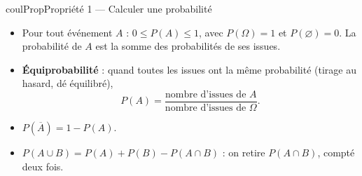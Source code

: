 \documentclass[11pt,a4paper]{article}
\makeatletter
\renewcommand{\le}{\leqslant}
\newcounter{lycee@signet}
\newcommand{\signet}[3][]{\stepcounter{lycee@signet}%
  \edef\lycee@dest{\if\relax\detokenize{#1}\relax
    signet.\arabic{lycee@signet}\else#1\fi}%
  \hypertarget{\lycee@dest}{}\bookmark[level=#2,dest=\lycee@dest]{#3}}
\newenvironment{proprietebox}[1][Propriété]%
  {\begin{boitecours}[phantom={\signet{2}{#1}}]{coulProp}{#1}}{\end{boitecours}}
\makeatother
\begin{document}
\begin{proprietebox}[Propriété 1 --- Calculer une probabilité]
\begin{itemize}
  \item Pour tout événement $A$ : $0\le P(A)\le 1$, avec $P(\Omega)=1$ et
    $P(\varnothing)=0$. La probabilité de $A$ est la somme des probabilités de ses issues.
  \item \textbf{Équiprobabilité} : quand toutes les issues ont la même probabilité
    (tirage \og au hasard\fg, dé équilibré),
    \[
      P(A)=\frac{\text{nombre d'issues de }A}{\text{nombre d'issues de }\Omega}.
    \]
  \item $P(\overline{A})=1-P(A)$.
  \item $P(A\cup B)=P(A)+P(B)-P(A\cap B)$ : on retire $P(A\cap B)$, compté deux fois.
\end{itemize}
\end{proprietebox}
\end{document}
